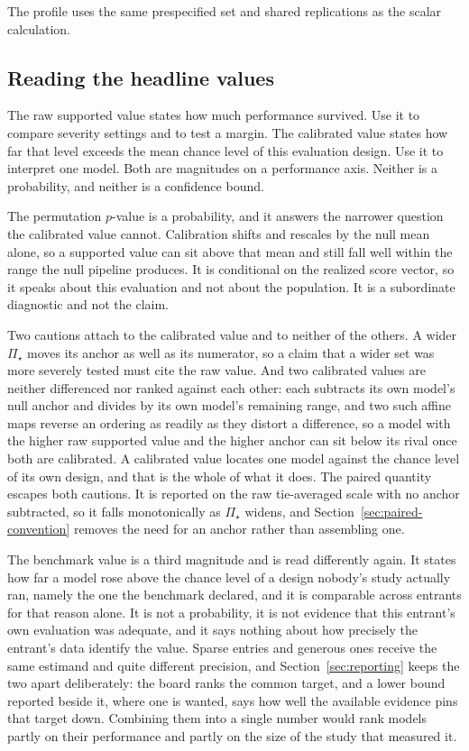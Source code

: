 \documentclass[11pt]{article}
\newcommand{\PSet}{\Pi_\star}
\theoremstyle{remark}
\begin{document}
The profile uses the same prespecified set and shared replications as the scalar calculation.

\subsection{Reading the headline values}

The raw supported value states how much performance survived. Use it to compare severity settings and to test a margin. The calibrated value states how far that level exceeds the mean chance level of this evaluation design. Use it to interpret one model. Both are magnitudes on a performance axis. Neither is a probability, and neither is a confidence bound.

The permutation $p$-value is a probability, and it answers the narrower question the calibrated value cannot. Calibration shifts and rescales by the null mean alone, so a supported value can sit above that mean and still fall well within the range the null pipeline produces. It is conditional on the realized score vector, so it speaks about this evaluation and not about the population. It is a subordinate diagnostic and not the claim.

Two cautions attach to the calibrated value and to neither of the others. A wider $\PSet$ moves its anchor as well as its numerator, so a claim that a wider set was more severely tested must cite the raw value. And two calibrated values are neither differenced nor ranked against each other: each subtracts its own model's null anchor and divides by its own model's remaining range, and two such affine maps reverse an ordering as readily as they distort a difference, so a model with the higher raw supported value and the higher anchor can sit below its rival once both are calibrated. A calibrated value locates one model against the chance level of its own design, and that is the whole of what it does. The paired quantity escapes both cautions. It is reported on the raw tie-averaged scale with no anchor subtracted, so it falls monotonically as $\PSet$ widens, and Section~\ref{sec:paired-convention} removes the need for an anchor rather than assembling one.

The benchmark value is a third magnitude and is read differently again. It states how far a model rose above the chance level of a design nobody's study actually ran, namely the one the benchmark declared, and it is comparable across entrants for that reason alone. It is not a probability, it is not evidence that this entrant's own evaluation was adequate, and it says nothing about how precisely the entrant's data identify the value. Sparse entries and generous ones receive the same estimand and quite different precision, and Section~\ref{sec:reporting} keeps the two apart deliberately: the board ranks the common target, and a lower bound reported beside it, where one is wanted, says how well the available evidence pins that target down. Combining them into a single number would rank models partly on their performance and partly on the size of the study that measured it.
\end{document}
